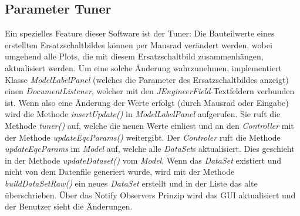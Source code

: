 \documentclass[a4paper,oneside,abstract,numbers=noenddot]{scrreprt}
\begin{document}
\subsection{Parameter Tuner}
Ein spezielles Feature dieser Software ist der Tuner: Die Bauteilwerte eines erstellten Ersatzschaltbildes können per Mausrad verändert werden, wobei umgehend alle Plots, die mit diesem Ersatzschaltbild zusammenhängen, aktualisiert werden. Um eine solche Änderung wahrzunehmen, implementiert Klasse \textit{ModelLabelPanel} (welches die Parameter des Ersatzschaltbildes anzeigt) einen \textit{DocumentListener}, welcher mit den \textit{JEngineerField}-Textfeldern verbunden ist. Wenn also eine Änderung der Werte erfolgt (durch Mausrad oder Eingabe) wird die Methode \textit{insertUpdate()} in \textit{ModelLabelPanel} aufgerufen. Sie ruft die Methode \textit{tuner()} auf, welche die neuen Werte einliest und an den \textit{Controller} mit der Methode \textit{updateEqcParams()} weitergibt. Der \textit{Controler} ruft die Methode \textit{updateEqcParams} im \textit{Model} auf, welche alle \textit{DataSet}s aktualisiert. Dies geschieht in der Methode \textit{updateDataset()} vom \textit{Model}. Wenn das \textit{DataSet} existiert und nicht von dem Datenfile generiert wurde, wird mit der Methode \textit{buildDataSetRaw()} ein neues \textit{DataSet} erstellt und in der Liste das alte überschrieben. Über das Notify Observers Prinzip wird das GUI aktualisiert und der Benutzer sieht die Änderungen.
\end{document}

